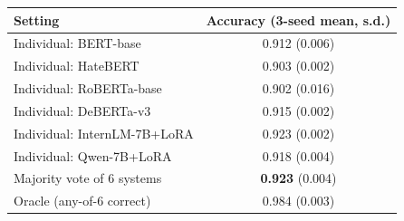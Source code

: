 \begin{tabular}{lc}
\toprule
Setting & Accuracy (3-seed mean, s.d.) \\
\midrule
Individual: BERT-base & 0.912 (0.006) \\
Individual: HateBERT & 0.903 (0.002) \\
Individual: RoBERTa-base & 0.902 (0.016) \\
Individual: DeBERTa-v3 & 0.915 (0.002) \\
Individual: InternLM-7B+LoRA & 0.923 (0.002) \\
Individual: Qwen-7B+LoRA & 0.918 (0.004) \\
\midrule
Majority vote of 6 systems & \textbf{0.923} (0.004) \\
Oracle (any-of-6 correct) & 0.984 (0.003) \\
\bottomrule
\end{tabular}
